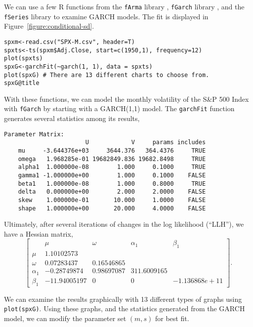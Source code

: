 We can use a few R functions from the \texttt{fArma} library \cite{farma-R}, \texttt{fGarch} library \cite{fgarch-R}, and the \texttt{fSeries} library \cite{fseries-R} to examine GARCH models. The fit is displayed in Figure~\ref{figure:conditional-sd}.
\begin{verbatim}
spxm<-read.csv("SPX-M.csv", header=T)
spxts<-ts(spxm$Adj.Close, start=c(1950,1), frequency=12)
plot(spxts)
spxG<-garchFit(~garch(1, 1), data = spxts)
plot(spxG) # There are 13 different charts to choose from.
spxG@title
\end{verbatim}

With these functions, we can model the monthly volatility of the S\&P 500 Index with \texttt{fGarch} by starting with a GARCH(1,1) model. The \texttt{garchFit} function generates several statistics among its results,
\begin{verbatim}
Parameter Matrix:
                       U            V     params includes
    mu     -3.644376e+03     3644.376   364.4376     TRUE
    omega   1.968285e-01 19682849.836 19682.8498     TRUE
    alpha1  1.000000e-08        1.000     0.1000     TRUE
    gamma1 -1.000000e+00        1.000     0.1000    FALSE
    beta1   1.000000e-08        1.000     0.8000     TRUE
    delta   0.000000e+00        2.000     2.0000    FALSE
    skew    1.000000e-01       10.000     1.0000    FALSE
    shape   1.000000e+00       20.000     4.0000    FALSE
\end{verbatim}
Ultimately, after several iterations of changes in the log likelihood (``LLH''), we have a Hessian matrix,
\[
\begin{bmatrix}
      &          \mu  &    \omega   &  \alpha_1    &   \beta_1 \\
\mu    &   1.10102573  \\
\omega &   0.07283437 & 0.16546865 \\
\alpha_1 &  -0.28749874 & 0.98697087 & 311.6009165 \\
\beta_1 & -11.94005197 & 0 &  0  & -1.136868e+11
\end{bmatrix}.
\]

We can examine the results graphically with 13 different types of graphs using \texttt{plot(spxG)}.  Using these graphs, and the statistics generated from the GARCH model, we can modify the parameter set $(m,s)$ for best fit.

